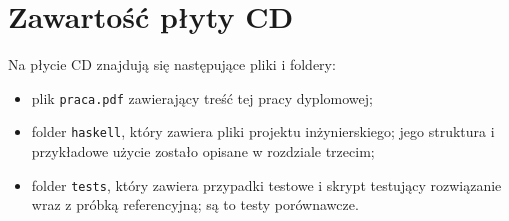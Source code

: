 \documentclass[../praca.tex]{subfiles}
\begin{document}
\appendix
\chapter{Zawartość płyty CD}

Na płycie CD znajdują się następujące pliki i foldery:
\begin{itemize}
  \item plik \texttt{praca.pdf} zawierający treść tej pracy dyplomowej;
  \item folder \texttt{haskell}, który zawiera pliki projektu inżynierskiego;
    jego struktura i przykładowe użycie zostało opisane w rozdziale trzecim;
  \item folder \texttt{tests}, który zawiera przypadki testowe i skrypt
    testujący rozwiązanie wraz z próbką referencyjną; są to testy porównawcze.
\end{itemize}
\end{document}
